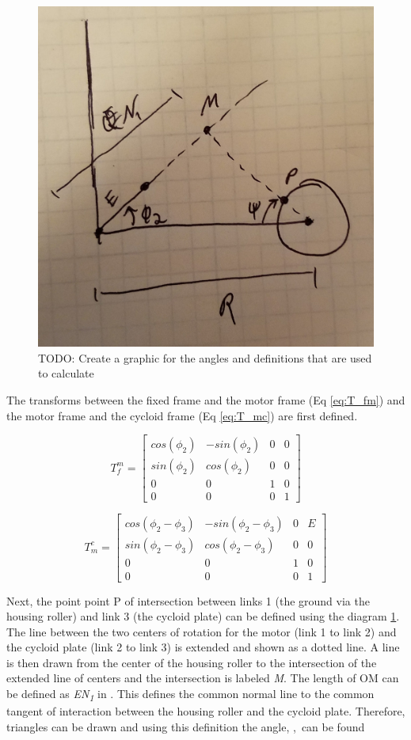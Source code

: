 \begin{figure}[h]
   \centering
   \includegraphics[width=0.60\linewidth]{fig/single_angles_TODO}
   \caption{TODO: Create a graphic for the angles and definitions that are used to calculate}
   \label{fig:single_angles}
\end{figure}

The transforms between the fixed frame and the motor frame (Eq \ref{eq:T_fm}) and the motor frame and the cycloid frame (Eq \ref{eq:T_mc}) are first defined. 

\begin{equation} \label{eq:T_fm}
T_f^m = \left[{\begin{array}{cccc}
		cos(\phi_2) & -sin(\phi_2) & 0 & 0\\
		sin(\phi_2) & cos(\phi_2) & 0 & 0\\
		0 & 0 & 1 & 0\\
		0 & 0 & 0 & 1 \end{array} } \right]
\end{equation}

\begin{equation} \label{eq:T_mc}
T_m^c = \left[{\begin{array}{cccc}
		cos(\phi_2 - \phi_3) & -sin(\phi_2 - \phi_3) & 0 & E\\
		sin(\phi_2 - \phi_3) & cos(\phi_2 - \phi_3) & 0 & 0\\
		0 & 0 & 1 & 0\\
		0 & 0 & 0 & 1 \end{array} } \right]
\end{equation}

Next, the point point P of intersection between links 1 (the ground via the housing roller) and link 3 (the cycloid plate) can be defined using the diagram \ref{fig:single_angles}. The line between the two centers of rotation for the motor (link 1 to link 2) and the cycloid plate (link 2 to link 3) is extended and shown as a dotted line. A line is then drawn from the center of the housing roller to the intersection of the extended line of centers and the intersection is labeled \textit{M}. The length of OM can be defined as \textit{EN\textsubscript{1}} in \cite{ref:on_the_lobe}. This defines the common normal line to the common tangent of interaction between the housing roller and the cycloid plate. Therefore, triangles can be drawn and using this definition the angle, \textpsi,\ can be found 


